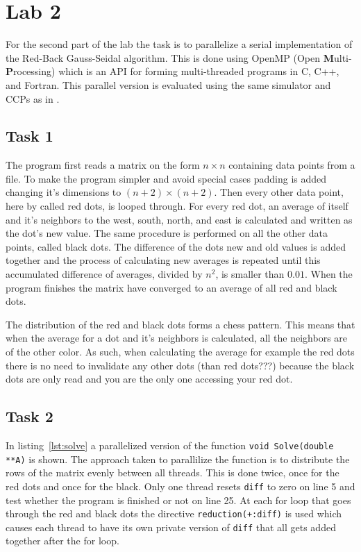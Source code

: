 \section{Lab 2}
\label{sec:lab2}
For the second part of the lab the task is to parallelize a serial implementation of the Red-Back Gauss-Seidal algorithm. This is done using OpenMP (Open \textbf Multi-\textbf Processing) which is an API for forming multi-threaded programs in C, C++, and Fortran. This parallel version is evaluated using the same simulator and CCPs as in . 

\subsection{Task 1}
The program first reads a matrix on the form $n \times n$ containing data points from a file. To make the program simpler and avoid special cases padding is added changing it's dimensions to $(n+2) \times (n+2)$. Then every other data point, here by called red dots, is looped through. For every red dot, an average of itself and it's neighbors to the west, south, north, and east is calculated and written as the dot's new value. The same procedure is performed on all the other data points, called black dots. The difference of the dots new and old values is added together and the process of calculating new averages is repeated until this accumulated difference of averages, divided by $n^2$, is smaller than $0.01$. When the program finishes the matrix have converged to an average of all red and black dots.

The distribution of the red and black dots forms a chess pattern. This means that when the average for a dot and it's neighbors is calculated, all the neighbors are of the other color. As such, when calculating the average for example the red dots there is no need to invalidate any other dots (than red dots???) because the black dots are only read and you are the only one accessing your red dot.

\subsection{Task 2}
\label{subsec:lab2:task2}
In listing~\ref{lst:solve} a parallelized version of the function \texttt{void Solve(double **A)} is shown. The approach taken to parallilize the function is to distribute the rows of the matrix evenly between all threads. This is done twice, once for the red dots and once for the black. Only one thread resets \texttt{diff} to zero on line 5 and test whether the program is finished or not on line 25. At each for loop that goes through the red and black dots the directive \texttt{reduction(+:diff)} is used which causes each thread to have its own private version of \texttt{diff} that all gets added together after the for loop.

